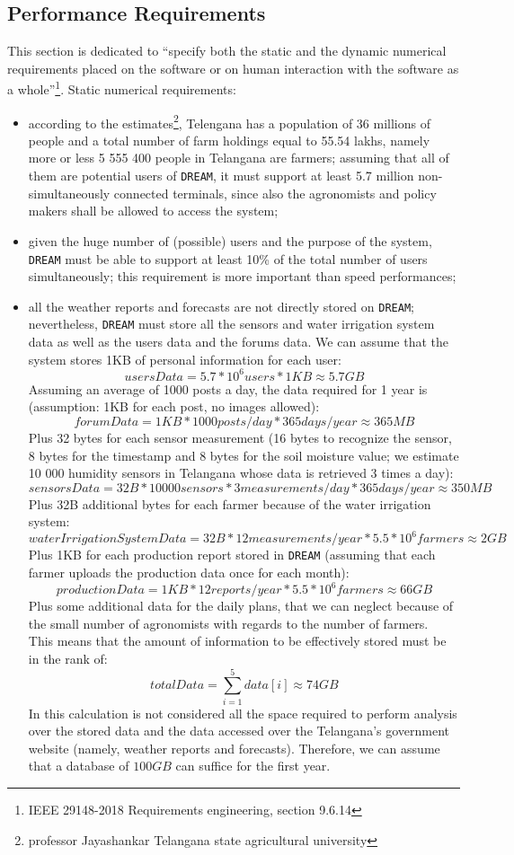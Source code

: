 \documentclass{article}
\begin{document}
\subsection{Performance Requirements}
This section is dedicated to “specify both the static and the dynamic numerical requirements placed on the software or on human interaction with the software as a whole”\footnote{IEEE 29148-2018 Requirements engineering, section 9.6.14}.
Static numerical requirements:
\begin{itemize}
\item according to the estimates\footnote{professor Jayashankar Telangana state agricultural university}, Telengana has a population of 36 millions of people and a total number of farm holdings equal to 55.54 lakhs, namely more or less 5 555 400 people in Telangana are farmers; assuming that all of them are potential users of \verb|DREAM|, it must support at least 5.7 million non-simultaneously connected terminals, since also the agronomists and policy makers shall be allowed to access the system;
\item given the huge number of (possible) users and the purpose of the system, \verb|DREAM| must be able to support at least 10\% of the total number of users simultaneously; this requirement is more important than speed performances;
\item all the weather reports and forecasts are not directly stored on \verb|DREAM|; nevertheless, \verb|DREAM| must store all the sensors and water irrigation system data as well as the users data and the forums data. 
We can assume that the system stores 1KB of personal information for each user:
\[ usersData = 5.7 * 10^6 users * 1 KB \approx 5.7 GB \]
Assuming an average of 1000 posts a day, the data required for 1 year is (assumption: 1KB for each post, no images allowed):
\[forumData = 1 KB * 1000 posts/day * 365 days/year \approx 365 MB \]
Plus 32 bytes for each sensor measurement (16 bytes to recognize the sensor, 8 bytes for the timestamp and 8 bytes for the soil moisture value; we estimate 10 000 humidity sensors in Telangana whose data is retrieved 3 times a day):
\[sensorsData = 32 B * 10 000 sensors * 3 measurements/day * 365 days/year \approx 350 MB \]
Plus 32B additional bytes for each farmer because of the water irrigation system:
\[waterIrrigationSystemData = 32 B * 12 measurements/year * 5.5 * 10^6 farmers \approx 2 GB \]
Plus 1KB for each production report stored in \verb|DREAM| (assuming that each farmer uploads the production data once for each month):
\[productionData = 1 KB * 12 reports/year * 5.5 * 10^6 farmers \approx 66 GB \]
Plus some additional data for the daily plans, that we can neglect because of the small number of agronomists with regards to the number of farmers.\\
This means that the amount of information to be effectively stored must be in the rank of:
\[totalData = \sum_{i=1}^{5} data[i] \approx 74 GB \]
In this calculation is not considered all the space required to perform analysis over the stored data and the data accessed over the Telangana's government website (namely, weather reports and forecasts). Therefore, we can assume that a database of $100 GB$ can suffice for the first year.
\end{itemize}
\end{document}
